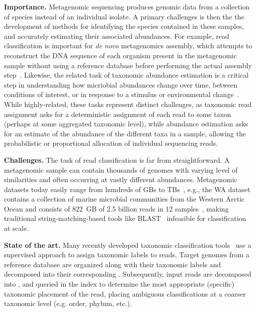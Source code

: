 \noindent
\textbf{Importance.}
Metagenomic sequencing produces genomic data from a collection of species instead of an individual isolate. A primary challenges is then the the development of methods for identifying the species contained in these samples, and accurately estimating their associated abundances.
%
For example, read classification is important for \emph{de novo} metagenomics assembly, which attempts to reconstruct the DNA sequence of each organism present in the metagenomic sample without using a reference database before performing the actual assembly step~\cite{venter2004environmental,brady2009phymm,brady2011phymmbl,rosen2008metagenome,segata2012metagenomic}.  Likewise, the related task of taxonomic abundance estimation is a critical step in understanding how micriobial abundances change over time, between conditions of interest, or in response to a stimulus or environmental change~\cite{Kaehler2019,wei2022kmcp,skoufos2022agamemnon,BlancoMguez2023}. While highly-related, these tasks represent distinct challenges, as taxonomic read assignment asks for a deterministic assignment of each read to some taxon (perhaps at some aggregated taxonomic level), while abundance estimation asks for an estimate of the abundance of the different taxa in a sample, allowing the probabilistic or proportional allocation of individual sequencing reads.

\noindent
\textbf{Challenges.}
The task of read classification is far from straightforward.
A metagenomic sample can contain thousands of genomes with varying level of similarities and often occurring at vastly different abundances. Metagenomic datasets today easily range from hundreds of GBs to TBs~\cite{hofmeyr2020terabase}, e.g., the WA dataset contains a collection of marine microbial communities from the Western Arctic Ocean and consists of 822~GB of 2.5 billion reads in 12 samples~\cite{hofmeyr2020terabase}, making traditional string-matching-based tools like BLAST~\cite{altschul1990basic} infeasible for classification at scale.
%

\noindent
\textbf{State of the art.}
Many recently developed taxonomic classification tools~\cite{ames2013scalable, kim2016centrifuge, menzel2016fast, wood2014kraken, wood2019improved, dilthey2019strain,liu2018novel} use a supervised approach to assign taxonomic labels to reads. Target genomes from a reference database are organized along with their taxonomic labels and decomposed into their corresponding \kmers. Subsequently, input reads are decomposed into \kmers, and queried in the index to determine the most appropriate (specific) taxonomic placement of the read, placing ambiguous classifications at a coarser taxonomic level (e.g. order, phylum, etc.).

